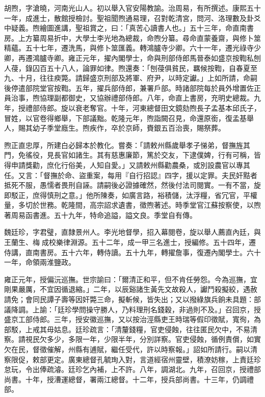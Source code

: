 \begin{pinyinscope}
胡煦，字滄曉，河南光山人。初以舉入官安陽教諭。治周易，有所撰述。康熙五十一年，成進士，散館授檢討。聖祖聞煦通易理，召對乾清宮，問河、洛理數及卦爻中疑義。煦繪圖進講，聖祖賞之，曰：「真苦心讀書人也。」五十三年，命直南書房。上方纂周易折中，大學士李光地為總裁，命煦分纂。尋命直蒙養齋，與修卜筮精蘊。五十七年，遷洗馬，與修卜筮匯義。轉鴻臚寺少卿。六十一年，遷光祿寺少卿，再遷鴻臚寺卿。雍正元年，擢內閣學士，命與刑部侍郎馬晉泰如盛京按鞫私刨人葠，錄囚百五十八人，論罪如律。煦還奏：「刨葠俱貧民，羈候按鞫，自春夏至九、十月，往往瘐斃。請歸盛京刑部及將軍、府尹，以時定讞。」上如所請，命嗣後停遣部院堂官按鞫。五年，擢兵部侍郎，兼署戶部。時諸部院每於員外增置佐正員治事，煦協理副都御史，又協辦禮部侍郎。八年，命直上書房，充明史總裁。九年，授禮部侍郎。旋以衰老奪官。十年，河東總督田文鏡劾煦長子孟基本邱氏子，冒姓，以官卷得鄉舉，下部議黜。乾隆元年，煦詣闕召見，命還原銜，復孟基舉人，賜其幼子季堂廕生。煦疾作，卒於京師，賚銀五百治喪，賜祭葬。

煦正直忠厚，所建白必歸本於教化。嘗奏：「請敕州縣歲舉孝子悌弟，督撫旌其門，免徭役，見長官如諸生。其有慈惠廉節，篤於交友，下逮僕婢，行有可稱，皆得申請獎勸，庶化行俗美，人知自愛。」又請敕州縣勸農桑，或別設農官以專其任。又言：「督撫於命、盜重案，每用『自行招認』四字，援以定罪。夫民奸黠者抵死不服，愚懦者畏刑自誣。請嗣後必證據確然，然後付法司閱實。一有不當，旋即駁正，庶得慎刑之意。」他所陳奏，如廣言路，裕積儲，汰浮糧，省冗官，平權量，多切於世務。乾隆間，高宗詔求遺書，徵煦著述。時季堂官江蘇按察使，以煦著周易函書進。五十九年，特命追謚，謚文良。季堂自有傳。

魏廷珍，字君璧，直隸景州人。李光地督學，招入幕閱卷，旋以舉人薦直內廷，與王蘭生、梅成校樂律淵源。五十二年，成一甲三名進士，授編修。五十四年，遷侍講，直南書房。五十六年，轉侍讀。五十九年，轉擢詹事，復遷內閣學士。六十一年，命領兩淮鹽政。

雍正元年，授偏沅巡撫。世宗諭曰：「爾清正和平，但不肯任勞怨。今為巡撫，宜剛果嚴厲，不宜因循退縮。」二年，以辰谿諸生黃先文故殺人，讞鬥殺擬絞，遇赦請免；會同民譚子壽等因奸斃三命，擬斬候，皆失出；又以撥綠旗兵餉未具題：部議降調。上諭：「廷珍學問操守勝人，乃料理刑名錢穀，非過則不及。」召回京，授盛京工部侍郎。三年，授安徽巡撫，又以按治涇縣吏王時瑞等假印徵賦，寬徇，為部駁，上戒其毋姑息。廷珍疏言：「清釐錢糧，官吏侵蝕，往往匿民欠中，不易清察。請視民欠多少，多限一年，少限半年，分別詳察。官吏侵蝕，循例責償，如實欠在民，督徵催解，州縣有逋賦，繼任受代，許以時察報。」詔如所請行。嗣以清察限促，敕部更定。廣東總督孔毓珣入對，言道經宿州靈壁，積潦妨稼，上責廷珍怠玩，令出俸疏濬。廷珍乞內補，上不許。八年，調湖北。九年，召回京，授禮部尚書。十年，授漕運總督，署兩江總督。十二年，授兵部尚書。十三年，仍調禮部。


\end{pinyinscope}

